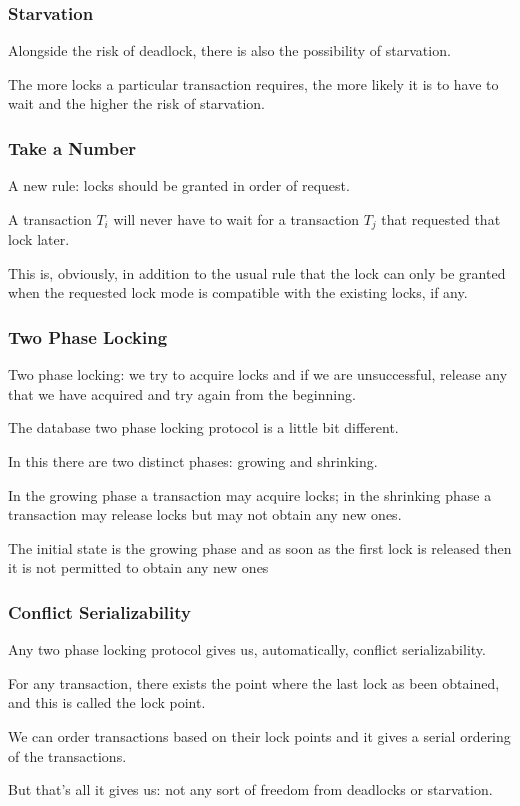 \begin{frame}
\frametitle{Starvation}

Alongside the risk of deadlock, there is also the possibility of starvation. 

The more locks a particular transaction requires, the more likely it is to have to wait and the higher the risk of starvation.

\end{frame}

\begin{frame}
\frametitle{Take a Number}

A new rule: locks should be granted in order of request.

A transaction $T_{i}$ will never have to wait for a transaction $T_{j}$ that requested that lock later. 

This is, obviously, in addition to the usual rule that the lock can only be granted when the requested lock mode is compatible with the existing locks, if any. 

\end{frame}

\begin{frame}
\frametitle{Two Phase Locking}

Two phase locking: we try to acquire locks and if we are unsuccessful, release any that we have acquired and try again from the beginning. 

The database two phase locking protocol is a little bit different. 

In this there are two distinct phases: growing and shrinking. 

In the growing phase a transaction may acquire locks; in the shrinking phase a transaction may release locks but may not obtain any new ones. 

The initial state is the growing phase and as soon as the first lock is released then it is not permitted to obtain any new ones

\end{frame}

\begin{frame}
\frametitle{Conflict Serializability}
Any two phase locking protocol gives us, automatically, conflict serializability. 

For any transaction, there exists the point where the last lock as been obtained, and this is called the \alert{lock point}. 

We can order transactions based on their lock points and it gives a serial ordering of the transactions. 

But that's all it gives us: not any sort of freedom from deadlocks or starvation.


\end{frame}

